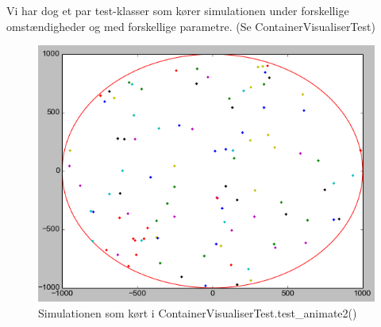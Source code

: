 \documentclass[paper=a4, fontsize=11pt]{scrartcl} %
\numberwithin{equation}{section} %
\numberwithin{figure}{section} %
\numberwithin{table}{section} %
\begin{document}
Vi har dog et par test-klasser som kører simulationen under forskellige omstændigheder og med forskellige parametre. (Se ContainerVisualiserTest)\\

\begin{figure}[h!]
  \centering
    \includegraphics[width=.8\textwidth]{figure_1.png}
  \caption{Simulationen som kørt i ContainerVisualiserTest.test\_animate2()}
\end{figure}
\pagebreak
\end{document}
